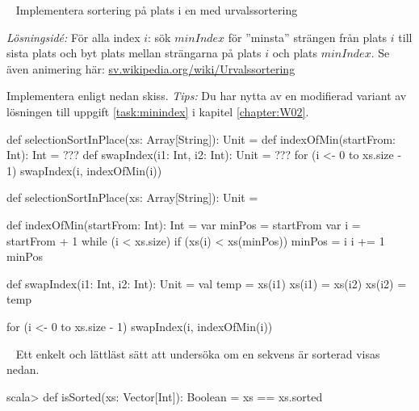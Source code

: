 
\QUESTBEGIN

\Task  \what~ Implementera sortering på plats  i en  med urvalssortering 

\emph{Lösningsidé:} För alla index $i$: sök $minIndex$ för ''minsta'' strängen från plats $i$ till sista plats och byt plats mellan strängarna på plats $i$ och plats $minIndex$. Se även animering här: \href{https://sv.wikipedia.org/wiki/Urvalssortering}{sv.wikipedia.org/wiki/Urvalssortering}

Implementera enligt nedan skiss.  \emph{Tips:} Du har nytta av en modifierad variant av lösningen till uppgift \ref{task:minindex} i kapitel \ref{chapter:W02}.
\begin{Code}
def selectionSortInPlace(xs: Array[String]): Unit = {
  def indexOfMin(startFrom: Int): Int = ???
  def swapIndex(i1: Int, i2: Int): Unit = ???
  for (i <- 0 to xs.size - 1) swapIndex(i, indexOfMin(i))
}
\end{Code}




\SOLUTION


\TaskSolved \what


\begin{Code}
def selectionSortInPlace(xs: Array[String]): Unit = {

  def indexOfMin(startFrom: Int): Int = {
    var minPos = startFrom
    var i = startFrom + 1
    while (i < xs.size) {
      if (xs(i) < xs(minPos)) minPos = i
      i += 1
    }
    minPos
  }

  def swapIndex(i1: Int, i2: Int): Unit = {
    val temp = xs(i1)
    xs(i1) = xs(i2)
    xs(i2) = temp
  }

  for (i <- 0 to xs.size - 1) swapIndex(i, indexOfMin(i))
}
\end{Code}


\QUESTEND


\clearpage






\QUESTBEGIN

\Task \label{task:isSorted} \what~   Ett enkelt och lättläst sätt att undersöka om en sekvens är sorterad visas nedan.
\begin{REPL}
scala> def isSorted(xs: Vector[Int]): Boolean = xs == xs.sorted
\end{REPL}


